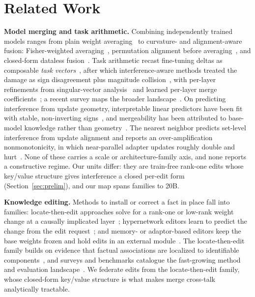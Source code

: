 \documentclass[preprint,12pt]{elsarticle}
\theoremstyle{definition}
\begin{document}
\section{Related Work}\label{sec:related}
\textbf{Model merging and task arithmetic.} Combining independently trained models ranges
from plain weight averaging~\cite{modelsoups2022} to curvature- and alignment-aware fusion:
Fisher-weighted averaging~\cite{fishermerging2022}, permutation alignment before
averaging~\cite{gitrebasin2023}, and closed-form dataless fusion~\cite{regmean2023}. Task
arithmetic recast fine-tuning deltas as composable \emph{task
vectors}~\cite{taskarithmetic2023}, after which interference-aware methods treated the
damage as sign disagreement plus magnitude collision~\cite{ties2023,dare2023}, with per-layer
refinements from singular-vector analysis~\cite{tsv2024} and learned per-layer merge
coefficients~\cite{adamerging2024}; a recent survey maps the broader
landscape~\cite{mergingsurvey2024}. On predicting interference from update geometry,
interpretable linear predictors have been fit with stable, non-inverting
signs~\cite{demystify2026}, and mergeability has been attributed to base-model knowledge
rather than geometry~\cite{willitmerge2026}. The nearest neighbor predicts set-level
interference from update alignment and reports an over-amplification nonmonotonicity, in
which near-parallel adapter updates roughly double and hurt~\cite{mergeprobe2026}. None of
these carries a scale or architecture-family axis, and none reports a constructive regime.
Our units differ: they are train-free rank-one edits whose key/value structure gives
interference a closed per-edit form (Section~\ref{sec:prelim}), and our map spans
\nFamilies{} families to 20B.

\textbf{Knowledge editing.} Methods to install or correct a fact in place fall into
families: locate-then-edit approaches solve for a rank-one or low-rank weight change at a
causally implicated layer~\cite{rome2022,memit2023,pmet2024,alphaedit2024}; hypernetwork
editors learn to predict the change from the edit request~\cite{decao2021,mend2022}; and
memory- or adaptor-based editors keep the base weights frozen and hold edits in an external
module~\cite{serac2022,grace2023,wise2024}. The locate-then-edit family builds on evidence
that factual associations are localized to identifiable
components~\cite{knowledgeneurons2022,rome2022}, and surveys and benchmarks catalogue the
fast-growing method and evaluation landscape~\cite{kesurvey2023,knowedit2024}. We federate
edits from the locate-then-edit family, whose closed-form key/value structure is what makes
merge cross-talk analytically tractable.
\end{document}
